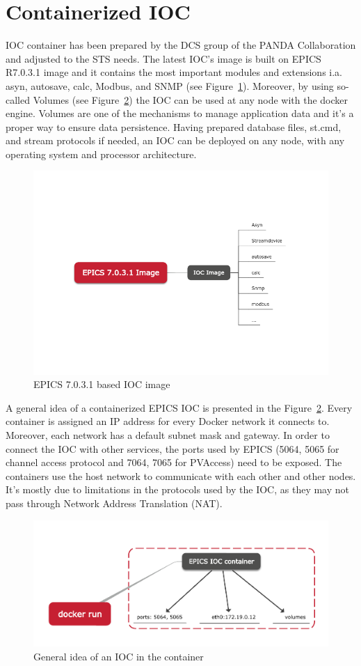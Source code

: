 \section{Containerized IOC}
IOC container has been prepared by the \gls{DCS} group of the \gls{PANDA} Collaboration and adjusted to the STS needs. The latest IOC's image is built on EPICS R7.0.3.1 image and it contains the most important modules and extensions i.a. asyn, autosave, calc, Modbus, and SNMP (see Figure~\ref{fig_ioc1}). Moreover, by using so-called Volumes (see Figure~\ref{fig_doc}) the \gls{IOC} can be used at any node with the docker engine. Volumes are one of the mechanisms to manage application data and it's a proper way to ensure data persistence. Having prepared database files, st.cmd, and stream protocols if needed, an IOC can be deployed on any node, with any operating system and processor architecture.
\begin{figure}[!h]
\centering
\includegraphics[width=0.65\columnwidth]{Chapter4/images/epics_ioc.png}
\caption{EPICS 7.0.3.1 based IOC image}
\label{fig_ioc1}
\end{figure}
\newpage
A general idea of a containerized \gls{EPICS} \gls{IOC} is presented in the Figure~\ref{fig_doc}. Every container is assigned an IP address for every Docker network it connects to. Moreover, each network has a default subnet mask and gateway. In order to connect the IOC with other services, the ports used by \gls{EPICS} (5064, 5065 for channel access protocol and 7064, 7065 for PVAccess) need to be exposed.  The containers use the host network to communicate with each other and other nodes. It's mostly due to limitations in the protocols used by the \gls{IOC}, as they may not pass through Network Address Translation (NAT).
\begin{figure}[!h]
\centering
\includegraphics[width=0.7\columnwidth]{Chapter4/images/docker_run.png}
\caption{General idea of an IOC in the container}
\label{fig_doc}
\end{figure}
\newpage
